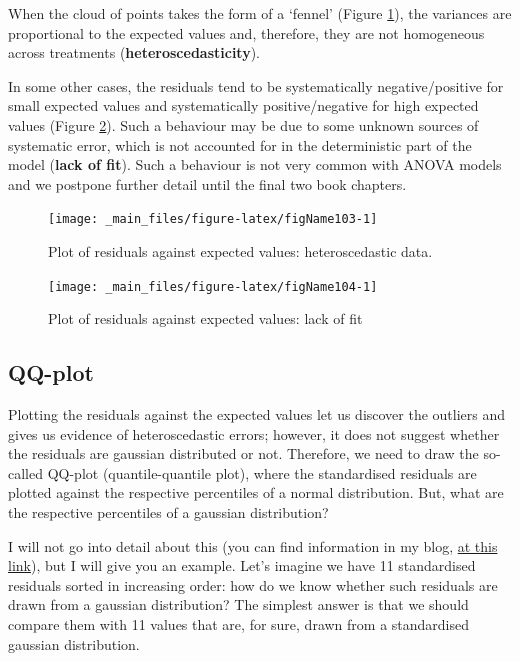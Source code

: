 \documentclass[a4paper,12pt,oneside]{book}
\begin{document}
When the cloud of points takes the form of a `fennel' (Figure \ref{fig:figName103}), the variances are proportional to the expected values and, therefore, they are not homogeneous across treatments (\textbf{heteroscedasticity}).

In some other cases, the residuals tend to be systematically negative/positive for small expected values and systematically positive/negative for high expected values (Figure \ref{fig:figName104}). Such a behaviour may be due to some unknown sources of systematic error, which is not accounted for in the deterministic part of the model (\textbf{lack of fit}). Such a behaviour is not very common with ANOVA models and we postpone further detail until the final two book chapters.

\begin{figure}

{\centering \texttt{[image: \_main\_files/figure-latex/figName103-1]} 

}

\caption{Plot of residuals against expected values: heteroscedastic data.}\label{fig:figName103}
\end{figure}

\begin{figure}

{\centering \texttt{[image: \_main\_files/figure-latex/figName104-1]} 

}

\caption{Plot of residuals against expected values: lack of fit}\label{fig:figName104}
\end{figure}

\hypertarget{qq-plot}{%
\subsection{QQ-plot}\label{qq-plot}}

Plotting the residuals against the expected values let us discover the outliers and gives us evidence of heteroscedastic errors; however, it does not suggest whether the residuals are gaussian distributed or not. Therefore, we need to draw the so-called QQ-plot (quantile-quantile plot), where the standardised residuals are plotted against the respective percentiles of a normal distribution. But, what are the respective percentiles of a gaussian distribution?

I will not go into detail about this (you can find information in my blog, \href{https://www.statforbiology.com/2020/stat_general_percentiles/}{at this link}), but I will give you an example. Let's imagine we have 11 standardised residuals sorted in increasing order: how do we know whether such residuals are drawn from a gaussian distribution? The simplest answer is that we should compare them with 11 values that are, for sure, drawn from a standardised gaussian distribution.
\end{document}

